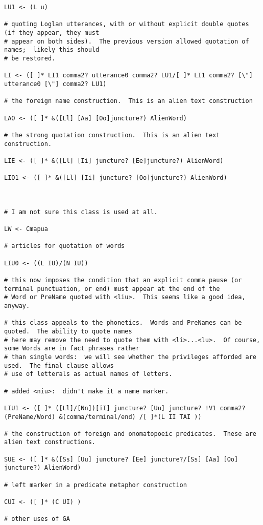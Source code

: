 \documentclass{article}
\begin{document}
\begin{verbatim}
LU1 <- (L u)

# quoting Loglan utterances, with or without explicit double quotes (if they appear, they must
# appear on both sides).  The previous version allowed quotation of names;  likely this should
# be restored.

LI <- ([ ]* LI1 comma2? utterance0 comma2? LU1/[ ]* LI1 comma2? [\"] utterance0 [\"] comma2? LU1)

# the foreign name construction.  This is an alien text construction

LAO <- ([ ]* &([Ll] [Aa] [Oo]juncture?) AlienWord)

# the strong quotation construction.  This is an alien text construction.

LIE <- ([ ]* &([Ll] [Ii] juncture? [Ee]juncture?) AlienWord)

LIO1 <- ([ ]* &([Ll] [Ii] juncture? [Oo]juncture?) AlienWord)



# I am not sure this class is used at all.

LW <- Cmapua

# articles for quotation of words

LIU0 <- ((L IU)/(N IU))

# this now imposes the condition that an explicit comma pause (or terminal punctuation, or end) must appear at the end of the
# Word or PreName quoted with <liu>.  This seems like a good idea, anyway.

# this class appeals to the phonetics.  Words and PreNames can be quoted.  The ability to quote names
# here may remove the need to quote them with <li>...<lu>.  Of course, some Words are in fact phrases rather
# than single words:  we will see whether the privileges afforded are used.  The final clause allows
# use of letterals as actual names of letters.

# added <niu>:  didn't make it a name marker.

LIU1 <- ([ ]* ([Ll]/[Nn])[iI] juncture? [Uu] juncture? !V1 comma2? (PreName/Word) &(comma/terminal/end) /[ ]*(L II TAI ))

# the construction of foreign and onomatopoeic predicates.  These are alien text constructions.

SUE <- ([ ]* &([Ss] [Uu] juncture? [Ee] juncture?/[Ss] [Aa] [Oo] juncture?) AlienWord)

# left marker in a predicate metaphor construction

CUI <- ([ ]* (C UI) )

# other uses of GA


\end{verbatim}
\end{document}

